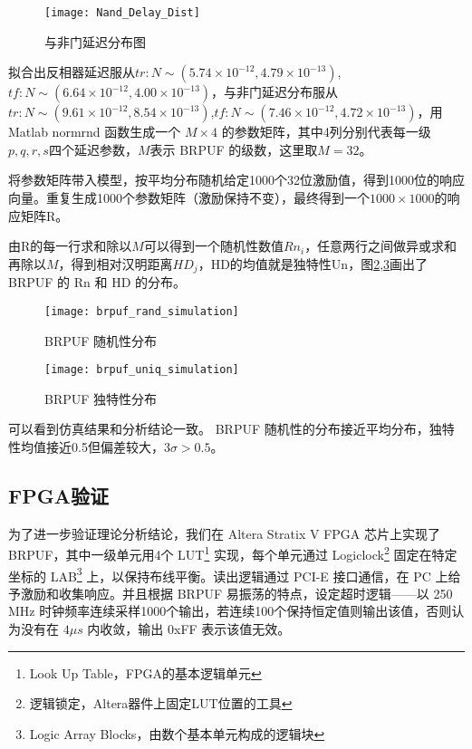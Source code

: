 \begin{figure}[htb!]
\centering
\texttt{[image: Nand\_Delay\_Dist]}
\caption{与非门延迟分布图}
\label{fig:nand-delay}
\end{figure}

拟合出反相器延迟服从$ tr: N\sim(5.74\times 10^{-12},4.79\times 10^{-13}) $, $ tf: N\sim(6.64\times 10^{-12},4.00\times 10^{-13}) $，与非门延迟分布服从$ tr: N\sim(9.61\times 10^{-12},8.54\times 10^{-13}) $,$ tf: N\sim(7.46\times 10^{-12},4.72\times 10^{-13}) $，用 Matlab normrnd 函数生成一个 $ M\times 4 $ 的参数矩阵，其中4列分别代表每一级$ p,q,r,s $四个延迟参数，$ M $表示 BRPUF 的级数，这里取$ M=32 $。

将参数矩阵带入模型，按平均分布随机给定1000个32位激励值，得到1000位的响应向量。重复生成1000个参数矩阵（激励保持不变），最终得到一个$ 1000\times 1000 $的响应矩阵R。

由R的每一行求和除以$ M $可以得到一个随机性数值$ Rn_i $，任意两行之间做异或求和再除以$ M $，得到相对汉明距离$ HD_j $，HD的均值就是独特性Un，图\ref{fig:brpufrand},\ref{fig:brpufuniq}画出了 BRPUF 的 Rn 和 HD 的分布。

\begin{figure}[htb!]
\centering
\texttt{[image: brpuf\_rand\_simulation]}
\caption{BRPUF 随机性分布}
\label{fig:brpufrand}
\end{figure}

\begin{figure}[htb!]
\centering
\texttt{[image: brpuf\_uniq\_simulation]}
\caption{BRPUF 独特性分布}
\label{fig:brpufuniq}
\end{figure}

可以看到仿真结果和分析结论一致。 BRPUF 随机性的分布接近平均分布，独特性均值接近0.5但偏差较大，$ 3\sigma>0.5 $。

\subsection{FPGA验证}\label{subsec:fpga}
为了进一步验证理论分析结论，我们在 Altera Stratix V FPGA 芯片上实现了 BRPUF，其中一级单元用4个 LUT\footnote{Look Up Table，FPGA的基本逻辑单元} 实现，每个单元通过 Logiclock\footnote{逻辑锁定，Altera器件上固定LUT位置的工具} 固定在特定坐标的 LAB\footnote{Logic Array Blocks，由数个基本单元构成的逻辑块} 上，以保持布线平衡。读出逻辑通过 PCI-E 接口通信，在 PC 上给予激励和收集响应。并且根据 BRPUF 易振荡的特点，设定超时逻辑——以 250 MHz 时钟频率连续采样1000个输出，若连续100个保持恒定值则输出该值，否则认为没有在 $ 4\mu s $ 内收敛，输出 0xFF 表示该值无效。

